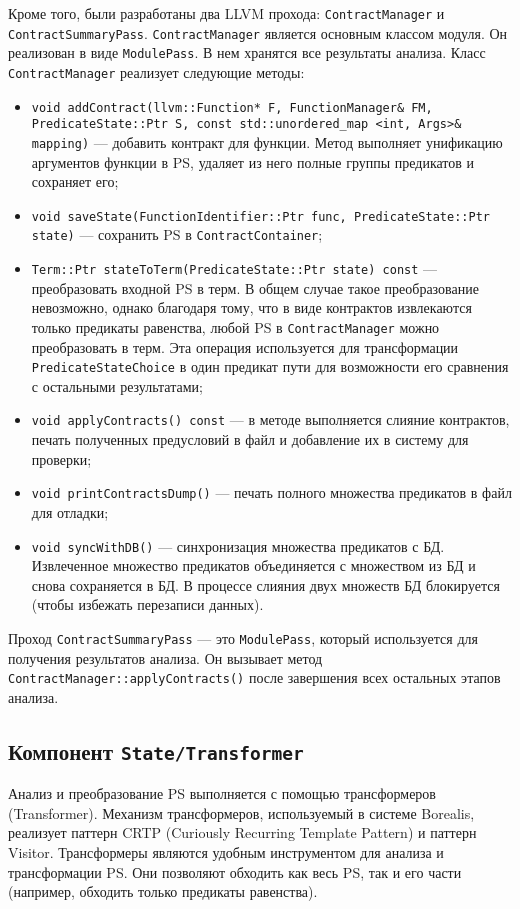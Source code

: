 Кроме того, были разработаны два LLVM прохода: \texttt{ContractManager} и \texttt{ContractSummaryPass}. \texttt{ContractManager} является основным классом модуля. Он реализован в виде \texttt{ModulePass}. В нем хранятся все результаты анализа. Класс \texttt{ContractManager} реализует следующие методы:
\begin{itemize}
\item \texttt{void addContract(llvm::Function* F, FunctionManager\& FM, PredicateState::Ptr S, const std::unordered_map <int, Args>\& mapping)} --- добавить контракт для функции. Метод выполняет унификацию аргументов функции в PS, удаляет из него полные группы предикатов и сохраняет его;
\item \texttt{void saveState(FunctionIdentifier::Ptr func, PredicateState::Ptr state)} --- сохранить PS в \texttt{ContractContainer};
\item \texttt{Term::Ptr stateToTerm(PredicateState::Ptr state) const} --- преобразовать входной PS в терм. В общем случае такое преобразование невозможно, однако благодаря тому, что в виде контрактов извлекаются только предикаты равенства, любой PS в \texttt{ContractManager} можно преобразовать в терм. Эта операция используется для трансформации \texttt{PredicateStateChoice} в один предикат пути для возможности его сравнения с остальными результатами;
\item \texttt{void applyContracts() const} --- в методе выполняется слияние контрактов, печать полученных предусловий в файл и добавление их в систему для проверки;
\item \texttt{void printContractsDump()} --- печать полного множества предикатов в файл для отладки;
\item \texttt{void syncWithDB()} --- синхронизация множества предикатов с БД. Извлеченное множество предикатов объединяется с множеством из БД и снова сохраняется в БД. В процессе слияния двух множеств БД блокируется (чтобы избежать перезаписи данных).
\end{itemize}

Проход \texttt{ContractSummaryPass} --- это \texttt{ModulePass}, который используется для получения результатов анализа. Он вызывает метод \texttt{ContractManager::applyContracts()} после завершения всех остальных этапов анализа.

\subsection{Компонент \texttt{State/Transformer}}
Анализ и преобразование PS выполняется с помощью трансформеров (Transformer). Механизм трансформеров, используемый в системе Borealis, реализует паттерн CRTP (Curiously Recurring Template Pattern)\cite{crtp} и паттерн Visitor\cite{patterns}. Трансформеры являются удобным инструментом для анализа и трансформации PS. Они позволяют обходить как весь PS, так и его части (например, обходить только предикаты равенства).

